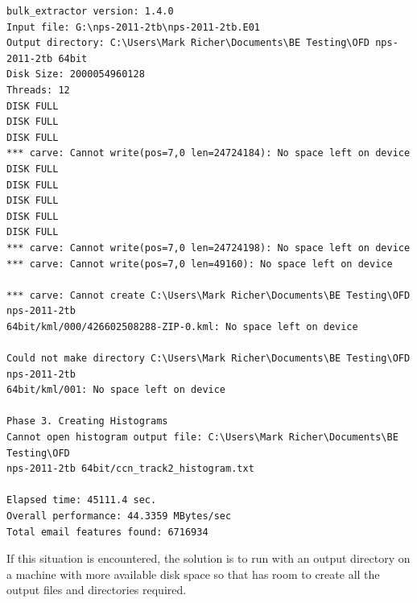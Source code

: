 \documentclass[11pt]{article} %
\begin{document}
\begingroup
\footnotesize
\begin{Verbatim}
bulk_extractor version: 1.4.0
Input file: G:\nps-2011-2tb\nps-2011-2tb.E01
Output directory: C:\Users\Mark Richer\Documents\BE Testing\OFD nps-2011-2tb 64bit
Disk Size: 2000054960128
Threads: 12
DISK FULL
DISK FULL
DISK FULL
*** carve: Cannot write(pos=7,0 len=24724184): No space left on device
DISK FULL
DISK FULL
DISK FULL
DISK FULL
DISK FULL
*** carve: Cannot write(pos=7,0 len=24724198): No space left on device
*** carve: Cannot write(pos=7,0 len=49160): No space left on device

*** carve: Cannot create C:\Users\Mark Richer\Documents\BE Testing\OFD nps-2011-2tb
64bit/kml/000/426602508288-ZIP-0.kml: No space left on device

Could not make directory C:\Users\Mark Richer\Documents\BE Testing\OFD nps-2011-2tb
64bit/kml/001: No space left on device

Phase 3. Creating Histograms
Cannot open histogram output file: C:\Users\Mark Richer\Documents\BE Testing\OFD
nps-2011-2tb 64bit/ccn_track2_histogram.txt

Elapsed time: 45111.4 sec.
Overall performance: 44.3359 MBytes/sec
Total email features found: 6716934
\end{Verbatim}
\endgroup
If this situation is encountered, the solution is to run \bulk with an output directory on a machine with more available disk space so that \bulk has room to create all the output files and directories required. 
\end{document}
